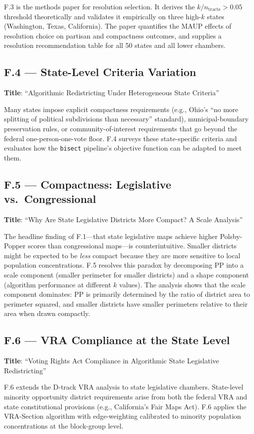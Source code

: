 F.3 is the methods paper for resolution selection. It derives the
$k/n_{\mathrm{tracts}} > 0.05$ threshold theoretically and validates it
empirically on three high-$k$ states (Washington, Texas, California).
The paper quantifies the MAUP effects of resolution choice on partisan
and compactness outcomes, and supplies a resolution recommendation table
for all 50 states and all lower chambers.

\subsection{F.4 --- State-Level Criteria Variation}
\label{sec:overview:f4}

\textbf{Title}: ``Algorithmic Redistricting Under Heterogeneous State Criteria''

Many states impose explicit compactness requirements (e.g., Ohio's
``no more splitting of political subdivisions than necessary'' standard),
municipal-boundary preservation rules, or community-of-interest requirements
that go beyond the federal one-person-one-vote floor.
F.4 surveys these state-specific criteria and evaluates how the \texttt{bisect}
pipeline's objective function can be adapted to meet them.

\subsection{F.5 --- Compactness: Legislative vs.\ Congressional}
\label{sec:overview:f5}

\textbf{Title}: ``Why Are State Legislative Districts More Compact? A Scale Analysis''

The headline finding of F.1---that state legislative maps achieve higher
Polsby-Popper scores than congressional maps---is counterintuitive.
Smaller districts might be expected to be \emph{less} compact because they
are more sensitive to local population concentrations.
F.5 resolves this paradox by decomposing PP into a scale component (smaller
perimeter for smaller districts) and a shape component (algorithm performance
at different $k$ values). The analysis shows that the scale component
dominates: PP is primarily determined by the ratio of district area to
perimeter squared, and smaller districts have smaller perimeters relative
to their area when drawn compactly.

\subsection{F.6 --- VRA Compliance at the State Level}
\label{sec:overview:f6}

\textbf{Title}: ``Voting Rights Act Compliance in Algorithmic State Legislative Redistricting''

F.6 extends the D-track VRA analysis \citep{dellaLibera2026vraCompliance}
to state legislative chambers. State-level minority opportunity district
requirements arise from both the federal VRA and state constitutional
provisions (e.g., California's Fair Maps Act). F.6 applies the
VRA-Section algorithm with edge-weighting calibrated to minority
population concentrations at the block-group level.
